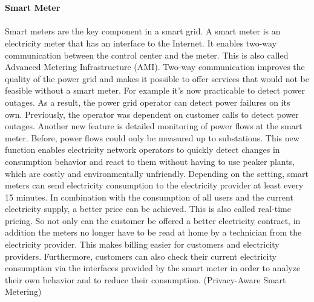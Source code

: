 \\
\\
\textbf{Smart Meter}
\\
\\
Smart meters are the key component in a smart grid. A smart meter is an electricity meter that has an interface to the Internet. It enables two-way communication between the control center and the meter. This is also called Advanced Metering Infrastructure (AMI). Two-way communication improves the quality of the power grid and makes it possible to offer services that would not be feasible without a smart meter. For example it's now practicable to detect power outages.%
As a result, the power grid operator can detect power failures on its own. Previously, the operator was dependent on customer calls to detect power outages. Another new feature is detailed monitoring of power flows at the smart meter. Before, power flows could only be measured up to substations. This new function enables electricity network operators to quickly detect changes in consumption behavior and react to them without having to use peaker plants, which are costly and environmentally unfriendly. Depending on the setting, smart meters can send electricity consumption to the electricity provider at least every 15 minutes. In combination with the consumption of all users and the current electricity supply, a better price can be achieved. This is also called real-time pricing. So not only can the customer be offered a better electricity contract, in addition the meters no longer have to be read at home by a technician from the electricity provider. This makes billing easier for customers and electricity providers. Furthermore, customers can also check their current electricity consumption via the interfaces provided by the smart meter in order to analyze their own behavior and to reduce their consumption. (Privacy-Aware Smart Metering)
